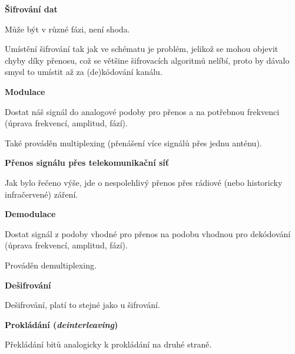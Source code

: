 \begin{compactenum}
    \item \textbf{Šifrování dat} \begin{compactitem}
        \item Může být v různé fázi, není shoda.
        \item Umístění šifrování tak jak ve schématu je problém, jelikož se mohou objevit chyby díky přenosu, což se většine šifrovacích algoritmů nelíbí, proto by dávalo smysl to umístit až za (de)kódování kanálu.
    \end{compactitem}

    \item \textbf{Modulace} \begin{compactitem}
        \item Dostat náš signál do analogové podoby pro přenos a na potřebnou frekvenci (úprava frekvencí, amplitud, fází).
        \item Také prováděn multiplexing (přenášení více signálů přes jednu anténu).
    \end{compactitem}

    \item \textbf{Přenos signálu přes telekomunikační síť} \begin{compactitem}
        \item Jak bylo řečeno výše, jde o nespolehlivý přenos přes rádiové (nebo historicky infračervené) záření.
    \end{compactitem}

    \item \textbf{Demodulace} \begin{compactitem}
        \item Dostat signál z podoby vhodné pro přenos na podobu vhodnou pro dekódování (úprava frekvencí, amplitud, fází).
        \item Prováděn demultiplexing.
    \end{compactitem}

    \item \textbf{Dešifrování} \begin{compactitem}
        \item Dešifrování, platí to stejné jako u šifrování.
    \end{compactitem}

    \item \textbf{Prokládání (\textit{deinterleaving})} \begin{compactitem}
        \item Překládání bitů analogicky k prokládání na druhé straně.
    \end{compactitem}


\end{compactenum}
